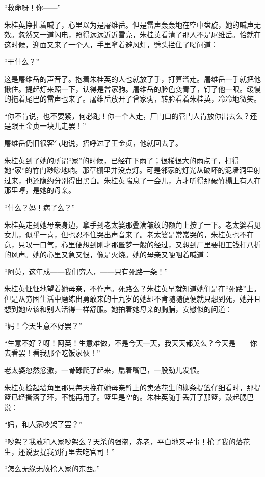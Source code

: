 \par “救命呀！你——”
\par 朱桂英挣扎着喊了，心里以为是屠维岳。但是雷声轰轰地在空中盘旋，她的喊声无效。忽然又一道闪电，照得远远近近雪亮，朱桂英看清了那人不是屠维岳。恰就在这时候，迎面又来了一个人，手里拿着避风灯，劈头拦住了喝问道：
\par “干什么？”
\par 这是屠维岳的声音了。抱着朱桂英的人也就放了手，打算溜走。屠维岳一手就把他揪住。提起灯来照一下，认得是曾家驹。屠维岳的脸色变青了，钉了他一眼。缓慢的拖着尾巴的雷声也来了。屠维岳放开了曾家驹，转脸看着朱桂英，冷冷地微笑。
\par “你不肯说，也不要紧，何必跑！你一个人走，厂门口的管门人肯放你出去么？还是跟王金贞一块儿走罢！”
\par 屠维岳仍旧很客气地说，招呼过了王金贞，他就回去了。
\par 朱桂英到了她的所谓“家”的时候，已经在下雨了；很稀很大的雨点子，打得她“家”的竹门唦唦地响。那草棚里并没点灯。可是邻家的灯光从破坏的泥墙洞里射过来，也还隐约分别得出黑白。朱桂英喘息了一会儿，方才听得那破竹榻上有人在那里哼，是她的母亲。
\par “什么？妈！病了么？”
\par 朱桂英走到她母亲身边，拿手到老太婆那叠满皱纹的额角上按了一下。老太婆看见女儿，似乎一喜，但也忍不住哭出声音来了。老太婆是常常哭的，朱桂英也不在意，只叹一口气，心里便想到刚才那噩梦一般的经过，又想到厂里要把工钱打八折的风声。她的心里又急又恨，像是火烧。她的母亲又哽咽着喊道：
\par “阿英，这年成——我们穷人，——只有死路一条！”
\par 朱桂英怔怔地望着她母亲，不作声。死路么？朱桂英早就知道她们是在“死路”上。但是从穷困生活中磨练出勇敢来的十九岁的她却不肯随随便便就只想到死，她并且想到她应该和别人活得一样舒服。她拍着她母亲的胸脯，安慰似的问道：
\par “妈！今天生意不好罢？”
\par “生意不好？呀！阿英！生意难做，不是今天一天，我天天都哭么？今天是——你去看罢！看我那个吃饭家伙！”
\par 老太婆忽然忿激，一骨碌爬了起来，扁着嘴巴，一股劲儿发恨。
\par 朱桂英检起墙角里那只每天挽在她母亲臂上的卖落花生的柳条提篮仔细看时，那提篮已经撕落了环，不能再用了。篮里是空的。朱桂英随手丢开了那篮，鼓起腮巴说：
\par “妈，和人家吵架了罢？”
\par “吵架？我敢和人家吵架么？天杀的强盗，赤老，平白地来寻事！抢了我的落花生，还说要捉我到行里去吃官司！”
\par “怎么无缘无故抢人家的东西。”
